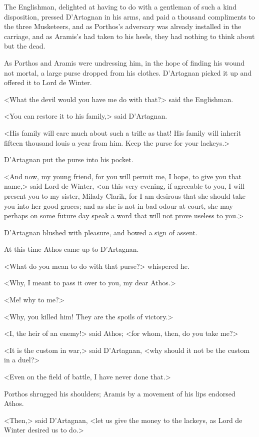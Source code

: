 The Englishman, delighted at having to do with a gentleman of such a kind disposition, pressed D'Artagnan in his arms, and paid a thousand compliments to the three Musketeers, and as Porthos's adversary was already installed in the carriage, and as Aramis's had taken to his heels, they had nothing to think about but the dead. 

As Porthos and Aramis were undressing him, in the hope of finding his wound not mortal, a large purse dropped from his clothes. D'Artagnan picked it up and offered it to Lord de Winter. 

<What the devil would you have me do with that?> said the Englishman. 

<You can restore it to his family,> said D'Artagnan. 

<His family will care much about such a trifle as that! His family will inherit fifteen thousand louis a year from him. Keep the purse for your lackeys.> 

D'Artagnan put the purse into his pocket. 

<And now, my young friend, for you will permit me, I hope, to give you that name,> said Lord de Winter, <on this very evening, if agreeable to you, I will present you to my sister, Milady Clarik, for I am desirous that she should take you into her good graces; and as she is not in bad odour at court, she may perhaps on some future day speak a word that will not prove useless to you.> 

D'Artagnan blushed with pleasure, and bowed a sign of assent. 

At this time Athos came up to D'Artagnan. 

<What do you mean to do with that purse?> whispered he. 

<Why, I meant to pass it over to you, my dear Athos.> 

<Me! why to me?> 

<Why, you killed him! They are the spoils of victory.> 

<I, the heir of an enemy!> said Athos; <for whom, then, do you take me?> 

<It is the custom in war,> said D'Artagnan, <why should it not be the custom in a duel?> 

<Even on the field of battle, I have never done that.> 

Porthos shrugged his shoulders; Aramis by a movement of his lips endorsed Athos. 

<Then,> said D'Artagnan, <let us give the money to the lackeys, as Lord de Winter desired us to do.> 

